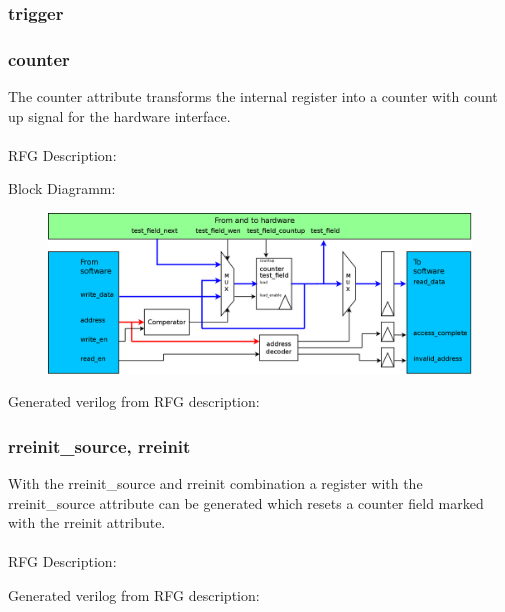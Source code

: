 \documentclass[12pt,a4paper]{article}
\begin{document}
\subsubsection{trigger}

\subsubsection{counter}
The counter attribute transforms the internal register into a counter with count up signal for the hardware interface.\\
\\
RFG Description:


Block Diagramm:
\begin{figure}[h!]
    \includegraphics[width=\textwidth]{pictures/Reg_hrw_srw_counter.png}
\end{figure}
\newpage
Generated verilog from RFG description:

\newpage

\subsubsection{rreinit\_source, rreinit}
With the rreinit\_source and rreinit combination a register with the rreinit\_source attribute can be generated which resets a counter field marked with the rreinit attribute.\\
\\
RFG Description:

\newpage
Generated verilog from RFG description:

\newpage
\end{document}
